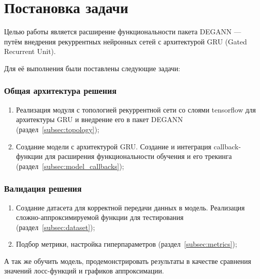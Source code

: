 
\section{Постановка задачи}
\label{sec:task}

Целью работы является расширение функциональности пакета DEGANN\cite{degann} --- путём внедрения рекуррентных нейронных сетей с архитектурой GRU (Gated Recurrent Unit)\cite{gru}.

Для её выполнения были поставлены следующие задачи:
\subsubsection{Общая архитектура решения}
\begin{enumerate}
    \item Реализация модуля с топологией рекуррентной сети со слоями tensorflow для архитектуры GRU и внедрение его в пакет DEGANN (раздел~\ref{subsec:topology});
    \item Создание модели с архитектурой GRU. Создание и интеграция callback-функции для расширения функциональности обучения и его трекинга (раздел~\ref{subsec:model_callbacks});
\end{enumerate}

\subsubsection*{Валидация решения}
\begin{enumerate}
    \item Создание датасета для корректной передачи данных в модель. Реализация сложно-аппроксимируемой функции для тестирования (раздел~\ref{subsec:dataset});
    \item Подбор метрики, настройка гиперпараметров (раздел~\ref{subsec:metrics});
\end{enumerate}

А так же обучить модель, продемонстрировать результаты в качестве сравнения значений лосс-функций и графиков аппроксимации.